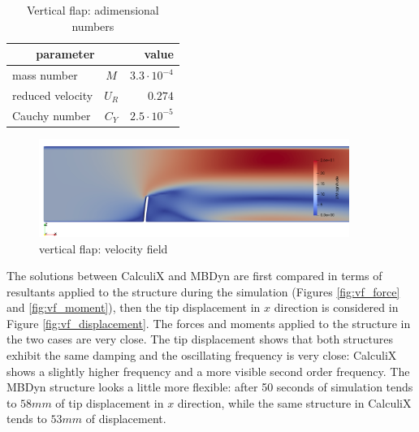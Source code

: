 \begin{table}[!htb]
	\begin{center}
		\begin{tabular}{ l c | r } 
			\multicolumn{2}{c|}{parameter} & value   \\ 
			\hline
			mass number  & $M$ & $3.3\cdot 10^{-4}$     \\
			reduced velocity & $U_R$ & $0.274$  \\
			Cauchy number  & $C_Y$ & $2.5\cdot 10^{-5}$  \\			
		\end{tabular}
	\end{center}
	\caption{Vertical flap: adimensional numbers}
	\label{table:ex1-adim}
\end{table}

\begin{figure}[htbp!]
	\centering
	\includegraphics[width=0.9\textwidth]{images/vert_flap/vert_flap1.png}
	\caption{vertical flap: velocity field}
	\label{fig:vf_sol}
\end{figure}


The solutions between CalculiX and MBDyn are first compared in terms of resultants applied to the structure during the simulation (Figures \ref{fig:vf_force} and \ref{fig:vf_moment}), then the tip displacement in $x$ direction is considered in Figure \ref{fig:vf_displacement}. The forces and moments applied to the structure in the two cases are very close. 
The tip displacement shows that both structures exhibit the same damping and the oscillating frequency is very close: CalculiX shows a slightly higher frequency and a more visible second order frequency. The MBDyn structure looks a little more flexible: after 50 seconds of simulation tends to $58mm$ of tip displacement in $x$ direction, while the same structure in CalculiX tends to $53mm$ of displacement. 

